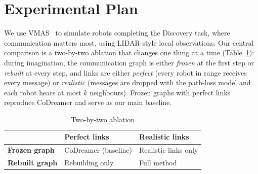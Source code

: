 \documentclass[conference]{IEEEtran}
\begin{document}
\section{Experimental Plan}
We use VMAS~\cite{bettini2022vmas} to simulate robots completing the Discovery task, where communication matters most, using LIDAR-style local observations. Our central comparison is a two-by-two ablation that changes one thing at a time (Table~\ref{tab:ablation}): during imagination, the communication graph is either \emph{frozen} at the first step or \emph{rebuilt} at every step, and links are either \emph{perfect} (every robot in range receives every message) or \emph{realistic} (messages are dropped with the path-loss model and each robot hears at most $k$ neighbours). Frozen graphs with perfect links reproduce CoDreamer and serve as our main baseline.

\begin{table}[h]
\centering
\caption{Two-by-two ablation}
\label{tab:ablation}
\begin{tabular}{@{}lll@{}}
\toprule
 & \textbf{Perfect links} & \textbf{Realistic links} \\
\midrule
\textbf{Frozen graph} & CoDreamer (baseline) & Realistic links only \\
\textbf{Rebuilt graph} & Rebuilding only & Full method \\
\bottomrule
\end{tabular}
\end{table}
\end{document}

